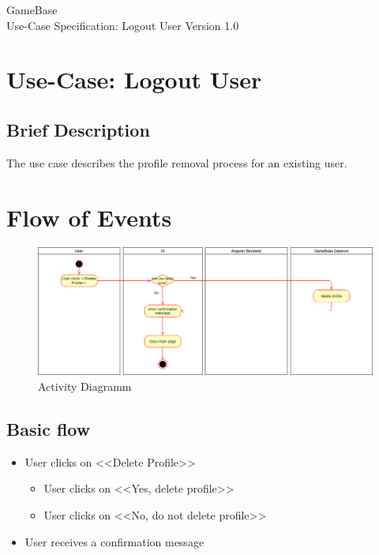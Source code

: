 \documentclass[a4paper,12pt,chapterprefix=false,bibliography=totoc,listof=totoc,book]{scrreprt}
\begin{document}
    \begin{flushright}
        GameBase
        \\
        Use-Case Specification: Logout User
        \bigbreak
        Version 1.0
    \end{flushright}

    \tableofcontents

    \chapter{Use-Case: Logout User}

    \section{Brief Description}
    The use case describes the profile removal process for an existing user.

    \chapter{Flow of Events}
    \begin{figure}[H]
        \includegraphics{diagramms/UCDeleteUserDiagramm.png}
        \caption{Activity Diagramm}
        \label{fig:ucd}
    \end{figure}
    \section{Basic flow}

    \begin{itemize}
        \item User clicks on <<Delete Profile>>
        \begin{itemize}
            \item User clicks on <<Yes, delete profile>>
            \item User clicks on <<No, do not delete profile>>
        \end{itemize}
        \item User receives a confirmation message
    \end{itemize}
\end{document}
